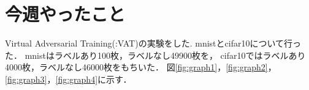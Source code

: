 \documentclass[twocolumn]{jarticle}     %
\begin{document}


\section{今週やったこと}

Virtual Adversarial Training(:VAT)の実験をした.
mnistとcifar10について行った．
mnistはラベルあり100枚，ラベルなし49900枚を，
cifar10ではラベルあり4000枚，ラベルなし46000枚をもちいた．
図\ref{fig:graph1}，\ref{fig:graph2}，
\ref{fig:graph3}，\ref{fig:graph4}に示す．
\end{document}
